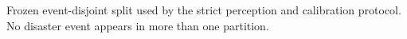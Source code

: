 \begin{table}[t]
\centering
\caption{Frozen event-disjoint split used by the strict perception and
calibration protocol. No disaster event appears in more than one partition.}
\label{tab:event-split}
\resizebox{\columnwidth}{!}{
}
\end{table}
